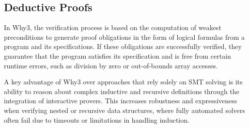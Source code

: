 \subsection{Deductive Proofs}
\label{sub:deductive_proofs}

In Why3, the verification process is based on the computation of weakest preconditions to generate proof obligations in the form of logical formulas from a program and its specifications. If these obligations are successfully verified, they guarantee that the program satisfies its specification and is free from certain runtime errors, such as division by zero or out-of-bounds array accesses.

A key advantage of Why3 over approaches that rely solely on SMT solving is its ability to reason about complex inductive and recursive definitions through the integration of interactive provers. This increases robustness and expressiveness when verifying nested or recursive data structures, where fully automated solvers often fail due to timeouts or limitations in handling induction.
